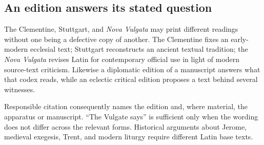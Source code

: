 \subsection{An edition answers its stated question}

The Clementine, Stuttgart, and \emph{Nova Vulgata} may print different readings without one being a defective copy of another. The Clementine fixes an early-modern ecclesial text; Stuttgart reconstructs an ancient textual tradition; the \emph{Nova Vulgata} revises Latin for contemporary official use in light of modern source-text criticism. Likewise a diplomatic edition of a manuscript answers what that codex reads, while an eclectic critical edition proposes a text behind several witnesses.

Responsible citation consequently names the edition and, where material, the apparatus or manuscript. ``The Vulgate says'' is sufficient only when the wording does not differ across the relevant forms. Historical arguments about Jerome, medieval exegesis, Trent, and modern liturgy require different Latin base texts.
